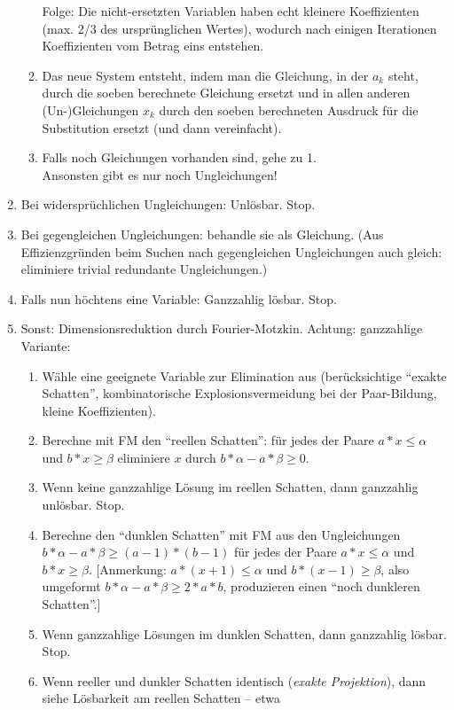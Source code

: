 \begin{enumerate}
\begin{enumerate}
    Folge: Die nicht-ersetzten Variablen haben echt kleinere
    Koeffizienten (max. 2/3 des ursprünglichen Wertes), wodurch nach
    einigen Iterationen Koeffizienten vom Betrag eins entstehen.
  \item Das neue System entsteht, indem man die Gleichung, in der $a_k$
    steht, durch die soeben berechnete Gleichung ersetzt und in allen
    anderen (Un-)Gleichungen $x_k$ durch den soeben berechneten Ausdruck
    für die Substitution ersetzt (und dann vereinfacht).
  \item Falls noch Gleichungen vorhanden sind, gehe zu 1. \\
    Ansonsten gibt es nur noch Ungleichungen!
  \end{enumerate}
\item Bei widersprüchlichen Ungleichungen: Unlösbar. Stop.
\item Bei gegengleichen Ungleichungen: behandle sie als Gleichung.
  (Aus Effizienzgründen beim Suchen nach gegengleichen Ungleichungen
  auch gleich: eliminiere trivial redundante Ungleichungen.)
\item Falls nun höchtens eine Variable: Ganzzahlig lösbar. Stop.
\item Sonst: Dimensionsreduktion durch Fourier-Motzkin. Achtung:
  ganzzahlige Variante:
  \begin{enumerate}
  \item Wähle eine geeignete Variable zur Elimination aus
    (berücksichtige ``exakte Schatten'', kombinatorische
    Explosionsvermeidung bei der Paar-Bildung, kleine Koeffizienten).
  \item Berechne mit FM den ``reellen Schatten'': für jedes der Paare
    $a*x\leq \alpha$ und $b*x\geq \beta$ eliminiere $x$ durch $b*\alpha - a*\beta \geq 0$.
  \item Wenn keine ganzzahlige Lösung im reellen Schatten, dann
      ganzzahlig unlösbar. Stop.
  \item Berechne den ``dunklen Schatten'' mit FM aus den Ungleichungen
    $b*\alpha - a*\beta \geq (a\!-\!1)*(b\!-\!1)$ für jedes der Paare
    $a*x\leq \alpha$ und $b*x\geq \beta$. [Anmerkung: $a*(x\!+\!1)\leq \alpha$ und
    $b*(x\!-\!1)\geq \beta$, also umgeformt $b*\alpha - a*\beta \geq 2*a*b$,
    produzieren einen ``noch dunkleren Schatten''.]
  \item Wenn ganzzahlige Lösungen im dunklen Schatten, dann ganzzahlig
    lösbar. Stop.
  \item Wenn reeller und dunkler Schatten identisch (\emph{exakte
      Projektion}), dann siehe Lösbarkeit am reellen Schatten -- etwa

\end{enumerate}
\end{enumerate}
